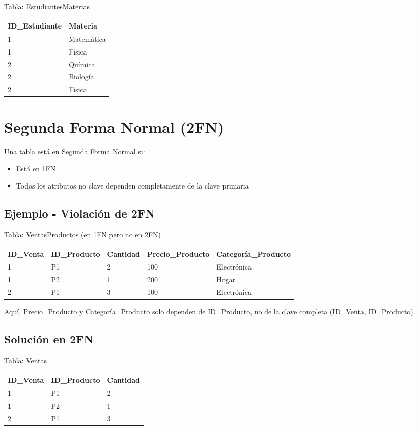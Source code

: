 \documentclass[12pt]{article}
\begin{document}
Tabla: EstudiantesMaterias
\begin{center}
\begin{tabular}{ll}
\toprule
ID\_Estudiante & Materia \\
\midrule
1 & Matemática \\
1 & Física \\
2 & Química \\
2 & Biología \\
2 & Física \\
\bottomrule
\end{tabular}
\end{center}

\section{Segunda Forma Normal (2FN)}
Una tabla está en Segunda Forma Normal si:
\begin{itemize}
    \item Está en 1FN
    \item Todos los atributos no clave dependen completamente de la clave primaria
\end{itemize}

\subsection{Ejemplo - Violación de 2FN}
Tabla: VentasProductos (en 1FN pero no en 2FN)
\begin{center}
\begin{tabular}{lllll}
\toprule
ID\_Venta & ID\_Producto & Cantidad & Precio\_Producto & Categoría\_Producto \\
\midrule
1 & P1 & 2 & 100 & Electrónica \\
1 & P2 & 1 & 200 & Hogar \\
2 & P1 & 3 & 100 & Electrónica \\
\bottomrule
\end{tabular}
\end{center}

Aquí, Precio\_Producto y Categoría\_Producto solo dependen de ID\_Producto, no de la clave completa (ID\_Venta, ID\_Producto).

\subsection{Solución en 2FN}

Tabla: Ventas
\begin{center}
\begin{tabular}{lll}
\toprule
ID\_Venta & ID\_Producto & Cantidad \\
\midrule
1 & P1 & 2 \\
1 & P2 & 1 \\
2 & P1 & 3 \\
\bottomrule
\end{tabular}
\end{center}
\end{document}
